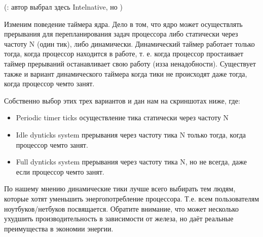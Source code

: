 \documentclass[letterpaper,10pt,russian,openany]{sphinxmanual}
\begin{document}
\sphinxAtStartPar
{}

\noindent{}

\sphinxAtStartPar
{}

\noindent{}

\sphinxAtStartPar
{}

\noindent{}

\sphinxAtStartPar
(: автор выбрал здесь Intel\sphinxhyphen{}native, но  )

\sphinxAtStartPar
{} Изменим поведение таймера ядра.
Дело в том, что ядро может осуществлять прерывания для перепланирования задач процессора либо статически через частоту N (один тик), либо динамически.
Динамический таймер работает только тогда, когда процессор находится в работе, т. е. когда процессор простаивает
таймер прерываний останавливает свою работу (из\sphinxhyphen{}за ненадобности). Существует также и вариант динамического таймера
когда тики не происходят даже тогда, когда процессор чем\sphinxhyphen{}то занят.

\sphinxAtStartPar
Собственно выбор этих трех вариантов и дан нам на скриншотах ниже, где:
\begin{itemize}
\item {} 
\sphinxAtStartPar
Periodic timer ticks \sphinxhyphen{} осуществление тика статически через частоту N

\item {} 
\sphinxAtStartPar
Idle dynticks system \sphinxhyphen{} прерывания через частоту тика N только тогда, когда процессор чем\sphinxhyphen{}то занят.

\item {} 
\sphinxAtStartPar
Full dynticks system \sphinxhyphen{} прерывания через частоту тика N, но не всегда, даже если процессор чем\sphinxhyphen{}то занят.

\end{itemize}

\sphinxAtStartPar
{}

\sphinxAtStartPar
По нашему мнению динамические тики лучше всего выбирать тем людям, которые хотят уменьшить энергопотребление процессора.
Т.е. всем пользователям ноутбуков/нетбуков посвящается. Обратите внимание, что  может несколько ухудшить производительность
в зависимости от железа, но даёт реальные преимущества в экономии энергии.
\end{document}
